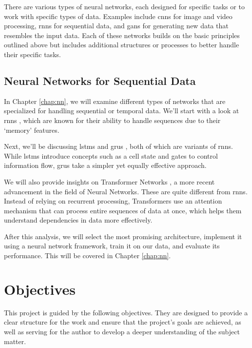 There are various types of neural networks, each designed for specific tasks or
to work with specific types of data. Examples include \glspl{cnn} for image and
video processing, \glspl{rnn} for sequential data, and \glspl{gan} for
generating new data that resembles the input data. Each of these networks
builds on the basic principles outlined above but includes additional
structures or processes to better handle their specific tasks.

\subsection{Neural Networks for Sequential Data}

In Chapter \ref{chap:nn}, we will examine different types of networks that are
specialized for handling sequential or temporal data. We'll start with a look
at \glspl{rnn} \citep{doi:10.1073/pnas.79.8.2554}, which are known for their
ability to handle sequences due to their `memory' features.

Next, we'll be discussing \glspl{lstm} and \glspl{gru}
\citep{lstm:1997,gru:2014}, both of which are variants of \glspl{rnn}. While
\glspl{lstm} introduce concepts such as a cell state and gates to control
information flow, \glspl{gru} take a simpler yet equally effective approach.

We will also provide insights on Transformer Networks \citep{attention:2017}, a
more recent advancement in the field of Neural Networks. These are quite
different from \glspl{rnn}. Instead of relying on recurrent processing,
Transformers use an attention mechanism that can process entire sequences of
data at once, which helps them understand dependencies in data more
effectively.

After this analysis, we will select the most promising architecture, implement
it using a neural network framework, train it on our data, and evaluate its
performance. This will be covered in Chapter \ref{chap:nn}.

\section{Objectives}\label{objectives}

This project is guided by the following objectives. They are designed to
provide a clear structure for the work and ensure that the project's goals are
achieved, as well as serving for the author to develop a deeper understanding
of the subject matter.

